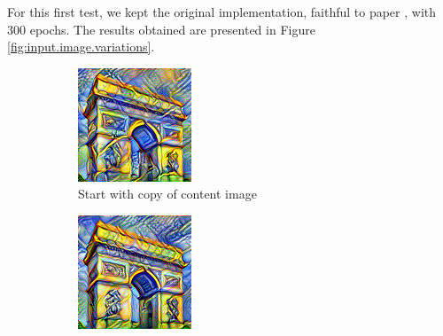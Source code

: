 \documentclass[twocolumn,superscriptaddress,aps, floatfix]{revtex4-1}
\begin{document}
    For this first test, we kept the original implementation, faithful to paper \cite{DBLP:journals/corr/GatysEB15a}, with 300 epochs. The results obtained are presented in Figure \ref{fig:input.image.variations}.
    
    \begin{figure}[ht]
        \centering
        \begin{subfigure}[b]{0.22\textwidth}
            \centering
            \includegraphics[width=\textwidth]{resources/png/inputs/sun-trees-paris-copy.png}
            \caption{Start with copy of content image}
        \end{subfigure}
        \hfill
        \begin{subfigure}[b]{0.22\textwidth}
            \centering
            \includegraphics[width=\textwidth]{resources/png/inputs/sun-trees-paris-noisy.png}

\end{subfigure}
\end{figure}
\end{document}
